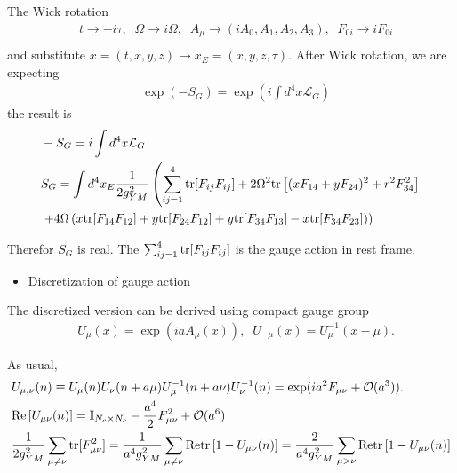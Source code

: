 The Wick rotation
\begin{equation}
\begin{split}
&t\to -i\tau,\;\;\Omega \to i\Omega ,\;\;A_{\mu}\to (iA_0,A_1,A_2,A_3),\;\;F_{0i}\to iF_{0i}\\
\end{split}
\end{equation}
and substitute $x=(t,x,y,z)\to x_E=(x,y,z,\tau)$. After Wick rotation, we are expecting
\begin{equation}
\begin{split}
&\exp(-S_G)=\exp (i\int d^4 x \mathcal{L}_G)
\end{split}
\end{equation}
the result is
\begin{equation}
\begin{split}
&-S_G=i\int d^4 x\mathcal{L}_G\\
&S_G=\int d^4 x_E \frac{1}{2g_{YM}^2}\left(\sum _{ij=1}^4 {\rm tr}[F_{ij}F_{ij}]+2\Omega^2 {\rm tr}\left[(x F_{14}+y F_{24})^2+r^2 F_{34}^2\right]\right.\\
&\left.+4\Omega\left(x {\rm tr}[F_{14}F_{12}]+y {\rm tr}[F_{24}F_{12}]+y {\rm tr}[F_{34}F_{13}]-x {\rm tr}[F_{34}F_{23}]\right)\right)
\end{split}
\end{equation}

Therefor $S_G$ is real. The $\sum _{ij=1}^4 {\rm tr}[F_{ij}F_{ij}]$ is the gauge action in rest frame.

\begin{itemize}
  \item Discretization of gauge action
\end{itemize}

The discretized version can be derived using compact gauge group
\begin{equation}
\begin{split}
&U_{\mu}(x)=\exp (i a A_{\mu}(x)),\;\;U_{-\mu}(x)=U_{\mu}^{-1}(x-\mu).
\end{split}
\end{equation}

As usual,
\begin{equation}
\begin{split}
&U_{\mu, \nu}(n)\equiv U_{\mu}(n)U_{\nu}(n+a\mu)U^{-1}_{\mu}(n+a\nu)U^{-1}_{\nu}(n)=\exp (ia^2 F_{\mu\nu}+\mathcal{O}(a^3)).\\
&{\rm Re}\left[U_{\mu \nu}(n)\right]=\mathbb{I}_{N_c\times N_c}-\frac{a^4}{2}F_{\mu\nu}^2+\mathcal{O}(a^6)\\
&\frac{1}{2g_{YM}^2}\sum _{\mu\neq \nu}{\rm tr}[F_{\mu\nu}^2]=\frac{1}{a^4g_{YM}^2}\sum _{\mu\neq \nu}{\rm Retr}\left[1-U_{\mu \nu}(n)\right]=\frac{2}{a^4g_{YM}^2}\sum _{\mu> \nu}{\rm Retr}\left[1-U_{\mu \nu}(n)\right]
\end{split}
\end{equation}

